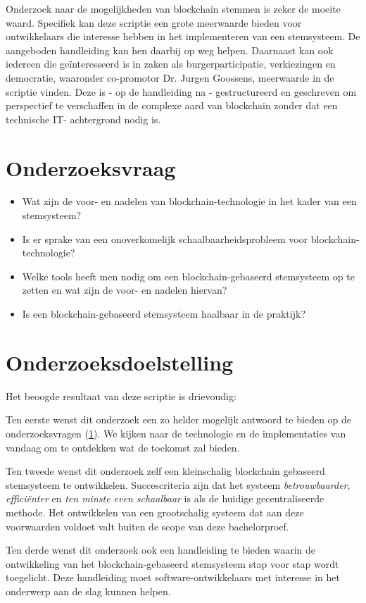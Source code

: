 Onderzoek naar de mogelijkheden van blockchain stemmen is zeker de moeite waard. Specifiek kan deze scriptie een grote meerwaarde bieden voor ontwikkelaars die interesse hebben in het implementeren van een stemsysteem. De aangeboden handleiding kan hen daarbij op weg helpen. Daarnaast kan ook iedereen die geïnteresseerd is in zaken als burgerparticipatie, verkiezingen en democratie, waaronder co-promotor Dr. Jurgen Goossens, meerwaarde in de scriptie vinden. Deze is - op de handleiding na - gestructureerd en geschreven om perspectief te verschaffen in de complexe aard van blockchain zonder dat een technische IT- achtergrond nodig is. 
\section{Onderzoeksvraag}
\label{sec:onderzoeksvraag}
\begin{itemize}
	\item Wat zijn de voor- en nadelen van blockchain-technologie in het kader van een stemsysteem?
	\item Is er sprake van een onoverkomelijk schaalbaarheidsprobleem voor blockchain-technologie?
	\item Welke tools heeft men nodig om een blockchain-gebaseerd stemsysteem op te zetten en wat zijn de voor- en nadelen hiervan?
	\item Is een blockchain-gebaseerd stemsysteem haalbaar in de praktijk?
\end{itemize}
\section{Onderzoeksdoelstelling}
\label{sec:onderzoeksdoelstelling}
Het beoogde resultaat van deze scriptie is drievoudig:

Ten eerste wenst dit onderzoek een zo helder mogelijk antwoord te bieden op de onderzoeksvragen (\ref{sec:onderzoeksvraag}). We kijken naar de technologie en de implementaties van vandaag om te ontdekken wat de toekomst zal bieden.

Ten tweede wenst dit onderzoek zelf een kleinschalig blockchain gebaseerd stemsysteem te ontwikkelen. Succescriteria zijn dat het systeem \textit{betrouwbaarder}, \textit{efficiënter} en \textit{ten minste even schaalbaar} is als de huidige gecentraliseerde methode. Het ontwikkelen van een grootschalig systeem dat aan deze voorwaarden voldoet valt buiten de scope van deze bachelorproef.

Ten derde wenst dit onderzoek ook een handleiding te bieden waarin de ontwikkeling van het blockchain-gebaseerd stemsysteem stap voor stap wordt toegelicht. Deze handleiding moet software-ontwikkelaars met interesse  in het onderwerp aan de slag kunnen helpen.
